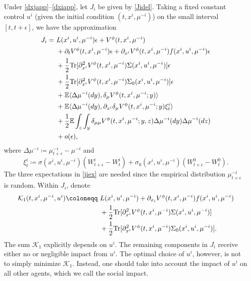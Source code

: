 \documentclass{amsart}
\theoremstyle{definition}
\theoremstyle{remark}
\def\cal{\mathcal}
\def\EE{{\mathbb E}}
\def\deltae{\epsilon}
\numberwithin{equation}{section}
\begin{document}
Under \eqref{dxjapp}--\eqref{dxiapp},
let $J_i$ be given by \eqref{Jidel}.
Taking a fixed constant control $u^i$ (given the initial condition $(t, x^i, \mu^{-i})$) on the small interval
$[t, t+\epsilon]$,
we have the approximation
\begin{align}
J_i=\ & L(x^i, u^i, \mu^{-i}) \deltae + V^\phi(t, x^i, \mu^{-i}) \label{jiex} \\
& + \partial_t V^\phi(t, x^i, \mu^{-i}) \deltae
+  \partial_{x^i}V^\phi (t, x^i, \mu^{-i})
f(x^i, u^i, \mu^{-i}) \deltae \notag  \\
&+ \frac{1}{2} {\rm Tr}
[\partial_{x^i}^2 V^\phi(t, x^i, \mu^{-i}) \Sigma  (x^i,u^i,\mu^{-i}  ) ] \deltae \notag  \\
&+ \frac{1}{2} {\rm Tr}
[\partial_{x^i}^2 V^\phi(t, x^i, \mu^{-i}) \Sigma_0  (x^i,u^i,\mu^{-i}  ) ] \deltae \notag  \\
&+
\EE\langle \Delta\mu^{-i}(dy) ,  \delta_{\mu} V^\phi (t, x^i, \mu^{-i}; y) \rangle  \notag    \\
&+ \EE \langle \Delta\mu^{-i}(dy) ,   \partial_{x^i} \delta_\mu V^\phi (t, x^i, \mu^{-i}; y)\xi_t^i \rangle \notag \\
&+ \frac{1}{2}\EE\int_z\int_y \delta_{\mu\mu} V^\phi (t, x^i, \mu^{-i}; y,z)\Delta \mu^{-i} (dy) \Delta\mu^{-i} (dz) \notag \\
&+ o(\deltae), \notag
\end{align}
where $\Delta\mu^{-i}\coloneqq \mu_{t+\deltae}^{-i}-\mu^{-i}  $ and
$$
\xi_t^i\coloneqq \sigma(x^i,u^i,\mu^{-i})(W_{t+\epsilon}^i-W_t^i)+
\sigma_0(x^i, u^i,\mu^{-i})(W_{t+\deltae}^0-W_t^0).
$$
The three expectations in \eqref{jiex} are needed since the  empirical distribution  $\mu_{t+\epsilon}^{-i} $  is random.
 Within $J_i$, denote
\begin{align*}
{\mathcal K}_1(t,x^i, \mu^{-i}, u^i)\coloneqq \ &L(x^i, u^i, \mu^{-i})+
\partial_{x_i} V^\phi (t, x^i, \mu^{-i})
f(x^i, u^i, \mu^{-i})\\
& + \frac{1}{2} {\rm Tr}
[\partial_{x^i}^2 V^\phi(t, x^i, \mu^{-i}) \Sigma  (x^i,u^i,\mu^{-i}  ) ] \\
&+ \frac{1}{2} {\rm Tr}
[\partial^2_{x^i} V^\phi(t, x^i, \mu^{-i}) \Sigma_0  (x^i,u^i,\mu^{-i}  ) ]  .
\end{align*}
The sum ${\cal K}_1$ explicitly depends on $u^i$.
The remaining components in $J_i$ receive either no or negligible impact from $u^i$.
The optimal choice of $u^i$, however, is not to simply minimize ${\cal K}_1$.
Instead, one should take into account the impact of $u^i$ on all other agents, which  we call the social impact.
\end{document}

